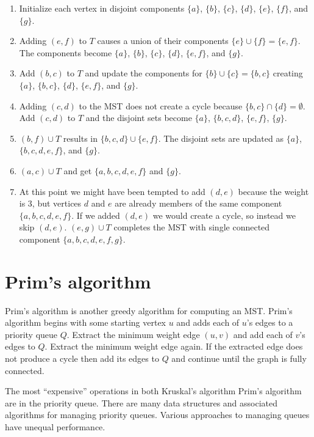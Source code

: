 \documentclass{book}
\begin{document}
\begin{enumerate}

\item Initialize each vertex in disjoint components $\{a\}$, $\{b\}$, $\{c\}$, $\{d\}$, $\{e\}$, $\{f\}$, and $\{g\}$.

\item Adding $(e,f)$ to $T$ causes a union of their components $\{e\} \cup \{f\} = \{e,f\}$. The components become $\{a\}$, $\{b\}$, $\{c\}$, $\{d\}$, $\{e,f\}$, and $\{g\}$.

\item Add $(b,c)$ to $T$ and update the components for $\{b\} \cup \{c\} = \{b,c\}$ creating $\{a\}$, $\{b,c\}$, $\{d\}$, $\{e,f\}$, and $\{g\}$.

\item Adding $(c,d)$ to the MST does not create a cycle because $\{b,c\} \cap \{d\} = \emptyset$. Add $(c,d)$ to $T$ and the disjoint sets become $\{a\}$, $\{b,c,d\}$, $\{e,f\}$, $\{g\}$.

\item $(b,f) \cup T$ results in $\{b,c,d\} \cup \{e,f\}$. The disjoint sets are updated as $\{a\}$, $\{b,c,d,e,f\}$, and $\{g\}$.

\item $(a,c) \cup T$ and get $\{a,b,c,d,e,f\}$ and $\{g\}$.

\item At this point we might have been tempted to add $(d,e)$ because the weight is 3, but vertices $d$ and $e$ are already members of the same component $\{a,b,c,d,e,f\}$. If we added $(d,e)$ we would create a cycle, so instead we skip $(d,e)$. $(e,g) \cup T$ completes the MST with single connected component $\{a,b,c,d,e,f,g\}$.

\end{enumerate}

\section{Prim's algorithm}

Prim's algorithm is another greedy algorithm for computing an MST. Prim's algorithm begins with some starting vertex $u$ and adds each of $u$'s edges to a priority queue $Q$. Extract the minimum weight edge $(u,v)$ and add each of $v$'s edges to $Q$. Extract the minimum weight edge again. If the extracted edge does not produce a cycle then add its edges to $Q$ and continue until the graph is fully connected.

The most ``expensive'' operations in both Kruskal's algorithm Prim's algorithm are in the priority queue. There are many data structures and associated algorithms for managing priority queues. Various approaches to managing queues have unequal performance.
\end{document}
